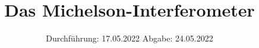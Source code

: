 

\subject{V401}
\title{Das Michelson-Interferometer}
\date{%
  Durchführung: 17.05.2022
  \hspace{3em}
  Abgabe: 24.05.2022
}



\maketitle
\thispagestyle{empty}
\tableofcontents
\newpage






\printbibliography{}

%


